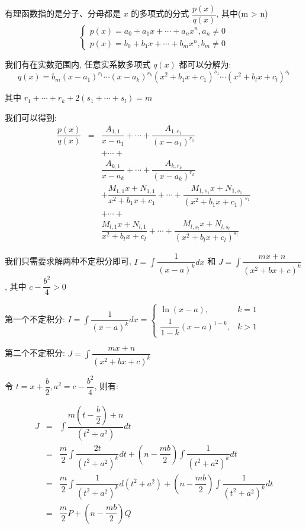 \begin{theorem}
	有理函数指的是分子、分母都是 $x$ 的多项式的分式 $\dfrac{p(x)}{q(x)}$, 其中(m > n)
	$$\begin{cases} p(x) = a_{0}+a_{1}x+\cdots+a_{n}x^{n},a_{n}\neq 0 \\ p(x) = b_{0}+b_{1}x+\cdots+b_{m}x^{n},b_{m}\neq 0  \end{cases}$$

	我们有在实数范围内, 任意实系数多项式 $q(x)$ 都可以分解为:
	$$q(x) = b_{m}(x-a_{1})^{r_{1}}\cdots(x-a_{k})^{r_{k}}(x^{2}+b_{1}x+c_{1})^{s_{1}}\cdots(x^{2}+b_{l}x+c_{l})^{s_{l}}$$

	其中 $r_{1}+\cdots+r_{k}+ 2(s_{1}+\cdots+s_{l}) = m$

	我们可以得到:
	\begin{eqnarray*}
		\dfrac{p(x)}{q(x)} &=& \dfrac{A_{1,1}}{x-a_{1}}+\cdots+\dfrac{A_{1,r_{1}}}{(x-a_{1})^{r_{1}}}\\
							& & + \cdots +\\
							& & \dfrac{A_{k,1}}{x-a_{k}}+\cdots+\dfrac{A_{k,r_{k}}}{(x-a_{k})^{r_{k}}}\\
							& & + \dfrac{M_{1,1}x+N_{1,1}}{x^{2}+b_{1}x+c_{1}}+\cdots+\dfrac{M_{1,s_{1}}x+N_{1,s_{1}}}{(x^{2}+b_{1}x+c_{1})^{s_{1}}}\\
							& & + \cdots +\\
							& & \dfrac{M_{l,1}x+N_{l,1}}{x^{2}+b_{l}x+c_{l}}+\cdots+\dfrac{M_{l,s_{l}}x+N_{l,s_{l}}}{(x^{2}+b_{l}x+c_{l})^{s_{l}}}
	\end{eqnarray*}

	我们只需要求解两种不定积分即可, $I = \int \dfrac{1}{(x-a)^{k}}dx$ 和 $J = \int \dfrac{mx+n}{(x^{2}+bx+c)^{k}}$, 其中 $c -\dfrac{b^{2}}{4} > 0$

	第一个不定积分: $I = \int \dfrac{1}{(x-a)^{k}}dx = \begin{cases}\ln(x-a), &k =1 \\ \dfrac{1}{1-k}(x-a)^{1-k}, &k > 1 \end{cases}$

	第二个不定积分: $J = \int \dfrac{mx+n}{(x^{2}+bx+c)^{k}}$

	令 $t =x+\dfrac{b}{2}, a^{2} = c -\dfrac{b^{2}}{4}$, 则有:
	
	\begin{eqnarray*}
		J &=& \int\dfrac{m(t-\dfrac{b}{2})+n}{(t^{2}+a^{2})}dt\\
			&=& \dfrac{m}{2}\int \dfrac{2t}{(t^{2}+a^{2})^{k}}dt + (n-\dfrac{mb}{2})\int \dfrac{1}{(t^{2}+a^{2})^{k}}dt\\
			&=& \dfrac{m}{2}\int \dfrac{1}{(t^{2}+a^{2})^{k}}d(t^{2}+a^{2}) + (n-\dfrac{mb}{2})\int \dfrac{1}{(t^{2}+a^{2})^{k}}dt\\ 
			&=& \dfrac{m}{2}P+(n-\dfrac{mb}{2})Q
	\end{eqnarray*}


\end{theorem}
